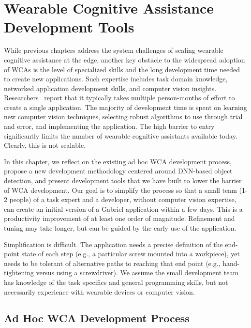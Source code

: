 \chapter{Wearable Cognitive Assistance Development Tools}
\label{chapter: app-dev}

While previous chapters address the system challenges of scaling wearable
cognitive assistance at the edge, another key obstacle to the widespread
adoption of WCAs is the level of specialized skills and the long development
time needed to create new applications. Such expertise includes task domain
knowledge, networked application development skills, and computer vision
insights. Researchers~\cite{chen2018application} report that it typically takes
multiple person-months of effort to create a single application. The majority of
development time is spent on learning new computer vision techniques, selecting
robust algorithms to use through trial and error, and implementing the
application. The high barrier to entry significantly limits the number of
wearable cognitive assistants available today. Clearly, this is not scalable.

In this chapter, we reflect on the existing ad hoc WCA development process,
propose a new development methodology centered around DNN-based object
detection, and present development tools that we have built to lower the barrier
of WCA development. Our goal is to simplify the process so that a small team
(1-2 people) of a task expert and a developer, without computer vision
expertise, can create an initial version of a Gabriel application within a few
days. This is a productivity improvement of at least one order of magnitude.
Refinement and tuning may take longer, but can be guided by the early use of the
application.

Simplification is difficult. The application needs a precise definition of the
end-point state of each step (e.g., a particular screw mounted into a
workpiece), yet needs to be tolerant of alternative paths to reaching that end
point (e.g., hand-tightening versus using a screwdriver). We assume the small
development team has knowledge of the task specifics and general programming
skills, but not necessarily experience with wearable devices or computer vision.

\section{Ad Hoc WCA Development Process}
\label{sec: app-dev-adhoc}

